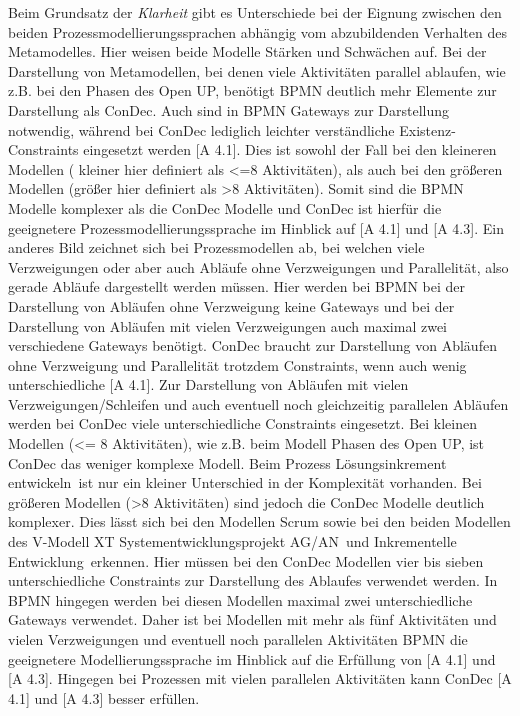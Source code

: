 {Beim Grundsatz der \textit{Klarheit} gibt es Unterschiede bei der Eignung zwischen den beiden Prozessmodellierungssprachen abhängig vom abzubildenden Verhalten des Metamodelles. Hier weisen beide Modelle Stärken und Schwächen auf. \newline
Bei der Darstellung von Metamodellen, bei denen viele Aktivitäten parallel ablaufen, wie z.B. bei den Phasen des Open UP, benötigt BPMN deutlich mehr Elemente zur Darstellung als ConDec. Auch sind in BPMN Gateways zur Darstellung notwendig, während bei ConDec lediglich leichter verständliche Existenz-Constraints eingesetzt werden [A 4.1]. Dies ist sowohl der Fall bei den kleineren Modellen ( kleiner hier definiert als <=8 Aktivitäten), als auch bei den größeren Modellen (größer hier definiert als >8 Aktivitäten). Somit sind die BPMN Modelle komplexer als die ConDec Modelle und ConDec ist hierfür die geeignetere Prozessmodellierungssprache im Hinblick auf [A 4.1] und [A 4.3]. \newline
Ein anderes Bild zeichnet sich bei Prozessmodellen ab, bei welchen viele Verzweigungen oder aber auch Abläufe ohne Verzweigungen und Parallelität, also gerade Abläufe dargestellt werden müssen. Hier werden bei BPMN bei der Darstellung von Abläufen ohne Verzweigung keine Gateways und bei der Darstellung von Abläufen mit vielen Verzweigungen auch maximal zwei verschiedene Gateways benötigt. ConDec braucht zur Darstellung von Abläufen ohne Verzweigung und Parallelität trotzdem Constraints, wenn auch wenig unterschiedliche [A 4.1]. Zur Darstellung von Abläufen mit vielen Verzweigungen/Schleifen und auch eventuell noch gleichzeitig parallelen Abläufen werden bei ConDec viele unterschiedliche Constraints eingesetzt. Bei kleinen Modellen (<= 8 Aktivitäten), wie z.B. beim Modell \grqq Phasen des Open UP\grqq, ist ConDec das weniger komplexe Modell. Beim Prozess \grqq Lösungsinkrement entwickeln\grqq \ ist nur ein kleiner Unterschied in der Komplexität vorhanden. Bei größeren Modellen (>8 Aktivitäten) sind jedoch die ConDec Modelle deutlich komplexer. Dies lässt sich bei den Modellen Scrum sowie bei den beiden Modellen des V-Modell XT \grqq Systementwicklungsprojekt AG/AN\grqq \ und \grqq Inkrementelle Entwicklung\grqq \ erkennen. Hier müssen bei den ConDec Modellen vier bis sieben unterschiedliche Constraints zur Darstellung des Ablaufes verwendet werden. In BPMN hingegen werden bei diesen Modellen maximal zwei unterschiedliche Gateways verwendet. Daher ist bei Modellen mit mehr als fünf Aktivitäten und vielen Verzweigungen und eventuell noch parallelen Aktivitäten BPMN die geeignetere Modellierungssprache im Hinblick auf die Erfüllung von [A 4.1] und [A 4.3]. Hingegen bei Prozessen mit vielen parallelen Aktivitäten kann ConDec [A 4.1] und [A 4.3] besser erfüllen.\newline

}
